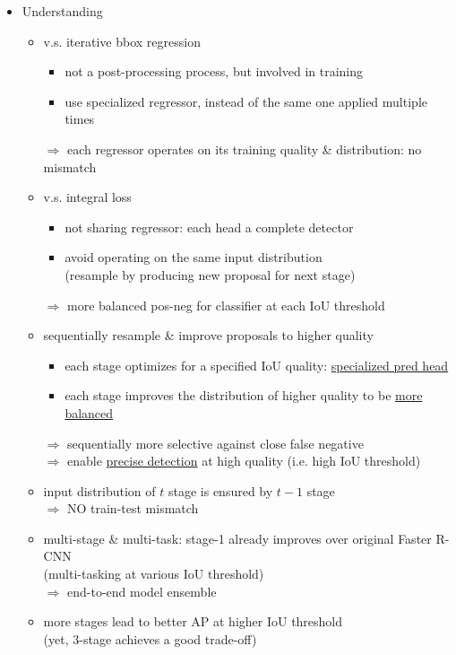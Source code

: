 \begin{itemize}
\begin{itemize}
	\item Understanding
		\begin{itemize}
		\item v.s. iterative bbox regression
			\begin{itemize}
			\item not a post-processing process, but involved in training
			\item use specialized regressor, instead of the same one applied multiple times
			\end{itemize}
		$\Rightarrow$ each regressor operates on its training quality \& distribution: no mismatch
		\item v.s. integral loss
			\begin{itemize}
			\item not sharing regressor: each head a complete detector
			\item avoid operating on the same input distribution \\
			(resample by producing new proposal for next stage)
			\end{itemize}
		$\Rightarrow$ more balanced pos-neg for classifier at each IoU threshold
		\item sequentially resample \& improve proposals to higher quality \\
			\begin{itemize}
			\item each stage optimizes for a specified IoU quality: \underline{specialized pred head}
			\item each stage improves the distribution of higher quality to be \underline{more balanced}
			\end{itemize}
		$\Rightarrow$ sequentially more selective against close false negative \\
		$\Rightarrow$ enable \underline{precise detection} at high quality (i.e. high IoU threshold)
		\item input distribution of $t$ stage is ensured by $t-1$ stage \\
		$\Rightarrow$ NO train-test mismatch
		\item multi-stage \& multi-task: stage-1 already improves over original Faster R-CNN \\
		(multi-tasking at various IoU threshold) \\
		$\Rightarrow$ end-to-end model ensemble
		\item more stages lead to better AP at higher IoU threshold \\
		(yet, 3-stage achieves a good trade-off)
		\end{itemize}
	\end{itemize}


\end{itemize}

